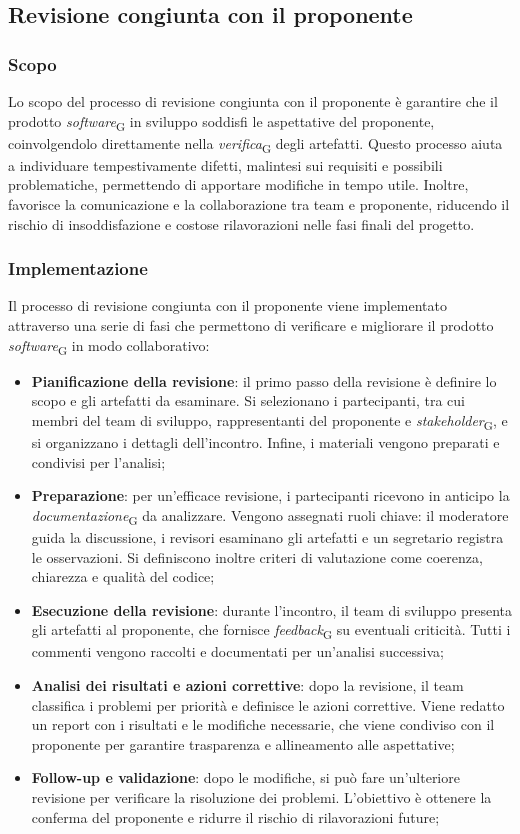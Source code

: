 \subsection{Revisione congiunta con il proponente}
\subsubsection{Scopo}
Lo scopo del processo di revisione congiunta con il proponente è garantire che il prodotto \textit{software}\textsubscript{G} in sviluppo soddisfi le aspettative del proponente, coinvolgendolo direttamente nella \textit{verifica}\textsubscript{G} degli artefatti. Questo processo aiuta a individuare tempestivamente difetti, malintesi sui requisiti e possibili problematiche, permettendo di apportare modifiche in tempo utile. Inoltre, favorisce la comunicazione e la collaborazione tra team e proponente, riducendo il rischio di insoddisfazione e costose rilavorazioni nelle fasi finali del progetto.

\subsubsection{Implementazione}
Il processo di revisione congiunta con il proponente viene implementato attraverso una serie di fasi che permettono di verificare e migliorare il prodotto \textit{software}\textsubscript{G} in modo collaborativo:
\begin{itemize}
    \item \textbf{Pianificazione della revisione}: il primo passo della revisione è definire lo scopo e gli artefatti da esaminare. Si selezionano i partecipanti, tra cui membri del team di sviluppo, rappresentanti del proponente e \textit{stakeholder}\textsubscript{G}, e si organizzano i dettagli dell’incontro. Infine, i materiali vengono preparati e condivisi per l'analisi;
    \item \textbf{Preparazione}: per un’efficace revisione, i partecipanti ricevono in anticipo la \textit{documentazione}\textsubscript{G} da analizzare. Vengono assegnati ruoli chiave: il moderatore guida la discussione, i revisori esaminano gli artefatti e un segretario registra le osservazioni. Si definiscono inoltre criteri di valutazione come coerenza, chiarezza e qualità del codice;
    \item \textbf{Esecuzione della revisione}: durante l’incontro, il team di sviluppo presenta gli artefatti al proponente, che fornisce \textit{feedback}\textsubscript{G} su eventuali criticità. Tutti i commenti vengono raccolti e documentati per un'analisi successiva;
    \item \textbf{Analisi dei risultati e azioni correttive}: dopo la revisione, il team classifica i problemi per priorità e definisce le azioni correttive. Viene redatto un report con i risultati e le modifiche necessarie, che viene condiviso con il proponente per garantire trasparenza e allineamento alle aspettative;
    \item \textbf{Follow-up e validazione}: dopo le modifiche, si può fare un'ulteriore revisione per verificare la risoluzione dei problemi. L'obiettivo è ottenere la conferma del proponente e ridurre il rischio di rilavorazioni future;
\end{itemize}

